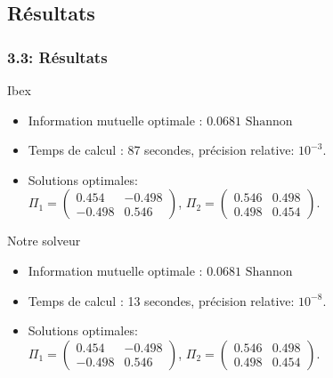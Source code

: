 \documentclass{beamer}
\begin{document}
\subsection{Résultats}
\begin{frame}
    \frametitle{3.3: Résultats}
    \begin{block}{Ibex}
\begin{itemize}
    \item Information mutuelle optimale : $0.0681 \text{ Shannon}$
    \item Temps de calcul : 87 secondes, précision relative: $10^{-3}$.
    \item Solutions optimales: \\ $\Pi_1 = \begin{pmatrix} 0.454 & -0.498 \\ -0.498 & 0.546 \end{pmatrix}$, \quad $\Pi_2 = \begin{pmatrix}0.546 & 0.498 \\ 0.498 & 0.454 \end{pmatrix}$.
\end{itemize}
    \end{block}

    \begin{block}{Notre solveur}

        \begin{itemize}
            \item Information mutuelle optimale : $0.0681 \text{ Shannon}$
            \item Temps de calcul : 13 secondes, précision relative: $10^{-8}$.
            \item Solutions optimales: \\ $\Pi_1 = \begin{pmatrix} 0.454 & -0.498 \\ -0.498 & 0.546 \end{pmatrix}$, \quad $\Pi_2 = \begin{pmatrix}0.546 & 0.498 \\ 0.498 & 0.454 \end{pmatrix}$.
        \end{itemize}

    \end{block}

\end{frame}
\end{document}
